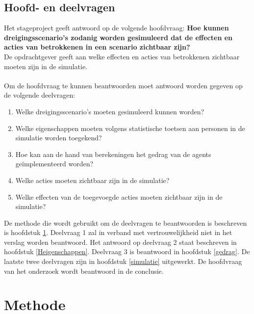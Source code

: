 \documentclass[12pt, letterpaper]{article}
\begin{document}
\subsection{Hoofd- en deelvragen}
Het stageproject geeft antwoord op de volgende hoofdvraag: \textbf{Hoe kunnen dreigingsscenario's zodanig worden gesimuleerd dat de effecten en acties van betrokkenen in een scenario zichtbaar zijn?} \\
De opdrachtgever geeft aan welke effecten en acties van betrokkenen zichtbaar moeten zijn in de simulatie.
\\ \\
Om de hoofdvraag te kunnen beantwoorden moet antwoord worden gegeven op de volgende deelvragen:
\begin{enumerate}
    \item Welke dreigingsscenario's moeten gesimuleerd kunnen worden?
    \item Welke eigenschappen moeten volgens statistische toetsen aan personen in de simulatie worden toegekend?
    \item Hoe kan aan de hand van berekeningen het gedrag van de agents geïmplementeerd worden?
    \item Welke acties moeten zichtbaar zijn in de simulatie?
    \item Welke effecten van de toegevoegde acties moeten zichtbaar zijn in de simulatie?
\end{enumerate}
De methode die wordt gebruikt om de deelvragen te beantwoorden is beschreven is hoofdstuk \ref{methode}.
Deelvraag 1 zal in verband met vertrouwelijkheid niet in het verslag worden beantwoord. Het antwoord op deelvraag 2 staat beschreven in hoofdstuk \ref{Heigenschappen}. Deelvraag 3 is beantwoord in hoofdstuk \ref{gedrag}.
De laatste twee deelvragen zijn in hoofdstuk \ref{simulatie} uitgewerkt. 
De hoofdvraag van het onderzoek wordt beantwoord in de conclusie.
\newpage



\section{Methode} \label{methode}
\end{document}

